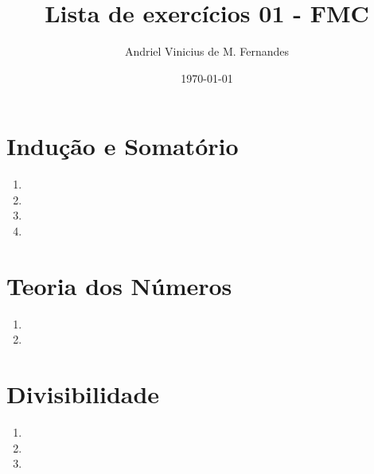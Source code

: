 \documentclass[12pt]{article}
\title{Lista de exercícios 01 - FMC}
\author{Andriel Vinicius de M. Fernandes}
\date{\today}
\begin{document}
\maketitle
\section{Indução e Somatório}
\begin{enumerate}
	\item 
	\item 
	\item 
	\item 
\end{enumerate}
\section{Teoria dos Números}
\begin{enumerate}
	\item 
	\item 
\end{enumerate}
\section{Divisibilidade}
\begin{enumerate}
	\item 
	\item 
	\item 
\end{enumerate}
\end{document}
